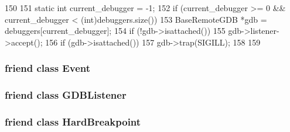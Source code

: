 \begin{DoxyCode}
150 {
151     static int current_debugger = -1;
152     if (current_debugger >= 0 && current_debugger < (int)debuggers.size()) {
153         BaseRemoteGDB *gdb = debuggers[current_debugger];
154         if (!gdb->isattached())
155             gdb->listener->accept();
156         if (gdb->isattached())
157             gdb->trap(SIGILL);
158     }
159 }
\end{DoxyCode}
\hypertarget{classBaseRemoteGDB_a3c7b3c89bf96f51e80a919b3a82a3915}{
\subsubsection[{Event}]{\setlength{\rightskip}{0pt plus 5cm}friend class {\bf Event}}}
\label{classBaseRemoteGDB_a3c7b3c89bf96f51e80a919b3a82a3915}
\hypertarget{classBaseRemoteGDB_a9759bc7ba80437d060e93ffb17361c55}{
\subsubsection[{GDBListener}]{\setlength{\rightskip}{0pt plus 5cm}friend class {\bf GDBListener}}}
\label{classBaseRemoteGDB_a9759bc7ba80437d060e93ffb17361c55}
\hypertarget{classBaseRemoteGDB_ad185c0396aa4b55d7f1fbb3749759247}{
\subsubsection[{HardBreakpoint}]{\setlength{\rightskip}{0pt plus 5cm}friend class {\bf HardBreakpoint}}}
\label{classBaseRemoteGDB_ad185c0396aa4b55d7f1fbb3749759247}


